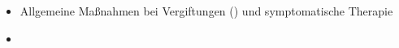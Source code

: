 \label{m:intoxikation-uppers}
\begin{itemize}
    \item Allgemeine Maßnahmen bei Vergiftungen
    () und
    symptomatische Therapie
    \item \TxBeiVit \TxMassVitMK
\end{itemize}